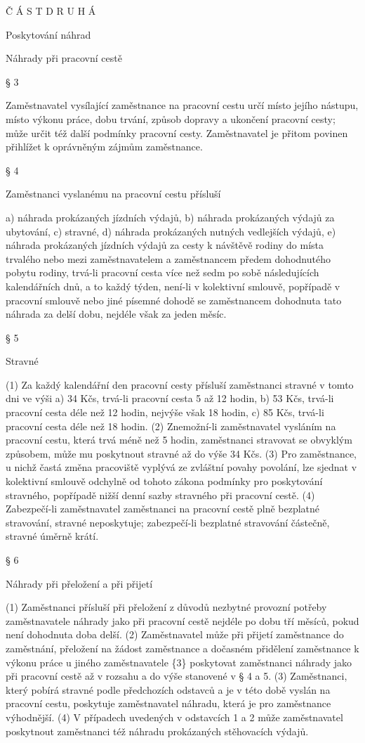 \documentclass[11pt,a4paper]{article}
\begin{document}
Č Á S T D R U H Á

Poskytování náhrad

Náhrady při pracovní cestě

§ 3

Zaměstnavatel vysílající zaměstnance na pracovní cestu určí místo jejího nástupu, místo výkonu práce, dobu trvání, způsob dopravy a ukončení pracovní cesty; může určit též další podmínky pracovní cesty. Zaměstnavatel je přitom povinen přihlížet k oprávněným zájmům zaměstnance.

§ 4

Zaměstnanci vyslanému na pracovní cestu přísluší

a) náhrada prokázaných jízdních výdajů, b) náhrada prokázaných výdajů za ubytování, c) stravné, d) náhrada prokázaných nutných vedlejších výdajů, e) náhrada prokázaných jízdních výdajů za cesty k návštěvě rodiny do místa trvalého nebo mezi zaměstnavatelem a zaměstnancem předem dohodnutého pobytu rodiny, trvá-li pracovní cesta více než sedm po sobě následujících kalendářních dnů, a to každý týden, není-li v kolektivní smlouvě, popřípadě v pracovní smlouvě nebo jiné písemné dohodě se zaměstnancem dohodnuta tato náhrada za delší dobu, nejdéle však za jeden měsíc.

§ 5

Stravné

(1) Za každý kalendářní den pracovní cesty přísluší zaměstnanci stravné v tomto dni ve výši a) 34 Kčs, trvá-li pracovní cesta 5 až 12 hodin, b) 53 Kčs, trvá-li pracovní cesta déle než 12 hodin, nejvýše však 18 hodin, c) 85 Kčs, trvá-li pracovní cesta déle než 18 hodin. (2) Znemožní-li zaměstnavatel vysláním na pracovní cestu, která trvá méně než 5 hodin, zaměstnanci stravovat se obvyklým způsobem, může mu poskytnout stravné až do výše 34 Kčs. (3) Pro zaměstnance, u nichž častá změna pracoviště vyplývá ze zvláštní povahy povolání, lze sjednat v kolektivní smlouvě odchylně od tohoto zákona podmínky pro poskytování stravného, popřípadě nižší denní sazby stravného při pracovní cestě. (4) Zabezpečí-li zaměstnavatel zaměstnanci na pracovní cestě plně bezplatné stravování, stravné neposkytuje; zabezpečí-li bezplatné stravování částečně, stravné úměrně krátí.

§ 6

Náhrady při přeložení a při přijetí

(1) Zaměstnanci přísluší při přeložení z důvodů nezbytné provozní potřeby zaměstnavatele náhrady jako při pracovní cestě nejdéle po dobu tří měsíců, pokud není dohodnuta doba delší. (2) Zaměstnavatel může při přijetí zaměstnance do zaměstnání, přeložení na žádost zaměstnance a dočasném přidělení zaměstnance k výkonu práce u jiného zaměstnavatele \{3\} poskytovat zaměstnanci náhrady jako při pracovní cestě až v rozsahu a do výše stanovené v § 4 a 5. (3) Zaměstnanci, který pobírá stravné podle předchozích odstavců a je v této době vyslán na pracovní cestu, poskytuje zaměstnavatel náhradu, která je pro zaměstnance výhodnější. (4) V případech uvedených v odstavcích 1 a 2 může zaměstnavatel poskytnout zaměstnanci též náhradu prokázaných stěhovacích výdajů.
\end{document}
